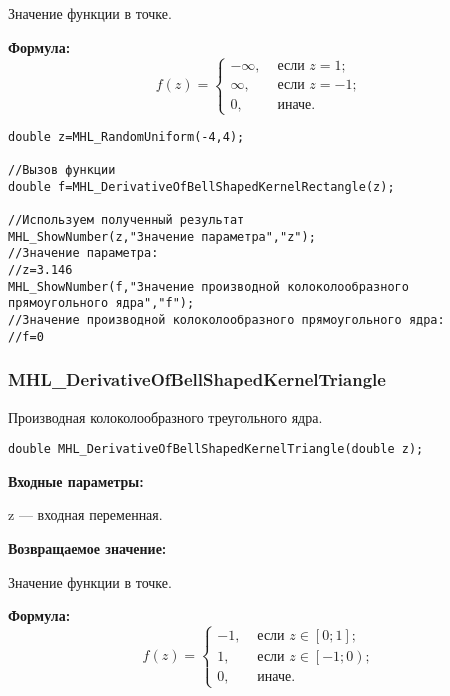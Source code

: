 \documentclass[a4paper,12pt]{article}
\begin{document}
Значение функции в точке.

\textbf{Формула:}
\begin{equation*}
f\left(z \right)=\left\lbrace \begin{aligned} -\infty,& \text{ если } z = 1 ; \\\infty,& \text{ если } z = -1 ; \\ 0,& \text{ иначе}. \end{aligned}\right.
\end{equation*}


\begin{lstlisting}[label=code_use_MHL_DerivativeOfBellShapedKernelRectangle,caption=Пример использования]
double z=MHL_RandomUniform(-4,4);

//Вызов функции
double f=MHL_DerivativeOfBellShapedKernelRectangle(z);

//Используем полученный результат
MHL_ShowNumber(z,"Значение параметра","z");
//Значение параметра:
//z=3.146
MHL_ShowNumber(f,"Значение производной колоколообразного прямоугольного ядра","f");
//Значение производной колоколообразного прямоугольного ядра:
//f=0
\end{lstlisting}

\subsubsection{MHL\_DerivativeOfBellShapedKernelTriangle}\label{MHL_DerivativeOfBellShapedKernelTriangle}

Производная колоколообразного треугольного ядра.


\begin{lstlisting}[label=code_syntax_MHL_DerivativeOfBellShapedKernelTriangle,caption=Синтаксис]
double MHL_DerivativeOfBellShapedKernelTriangle(double z);
\end{lstlisting}

\textbf{Входные параметры:}
 
z --- входная переменная.

\textbf{Возвращаемое значение:}
 
Значение функции в точке.

\textbf{Формула:}
\begin{equation*}
f\left(z \right)=\left\lbrace \begin{aligned} -1,& \text{ если } z \in \left[ 0; 1\right]   ; \\1,& \text{ если } z \in \left[ -1; 0\right) ; \\ 0,& \text{ иначе}. \end{aligned}\right.
\end{equation*}
\end{document}
